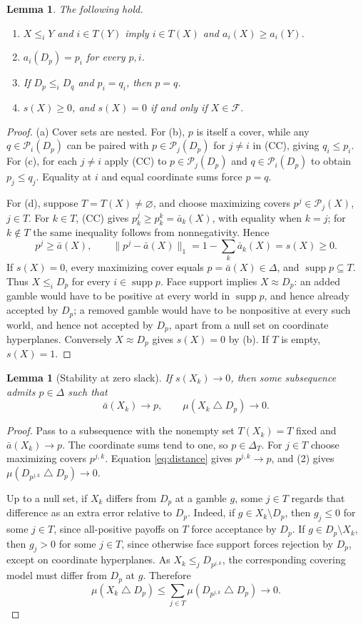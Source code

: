 \documentclass[11pt]{article}
\newtheorem{lemma}[theorem]{Lemma}
\theoremstyle{remark}
\newcommand{\supp}{\operatorname{supp}}
\newcommand{\sd}{\mathbin{\triangle}}
\newcommand{\Pc}{\mathcal P}
\newcommand{\F}{\mathcal F}
\begin{document}
\begin{lemma}\label{lem:elementary}
The following hold.
\begin{enumerate}[label=(\alph*)]
\item $X\le_iY$ and $i\in T(Y)$ imply $i\in T(X)$ and
$a_i(X)\ge a_i(Y)$.
\item $a_i(D_p)=p_i$ for every $p,i$.
\item If $D_p\le_iD_q$ and $p_i=q_i$, then $p=q$.
\item $s(X)\ge0$, and $s(X)=0$ if and only if $X\in\F$.
\end{enumerate}
\end{lemma}
\begin{proof}
(a) Cover sets are nested. For (b), $p$ is itself a cover, while any
$q\in\Pc_i(D_p)$ can be paired with $p\in\Pc_j(D_p)$ for $j\ne i$ in (CC),
giving $q_i\le p_i$. For (c), for each $j\ne i$ apply (CC) to
$p\in\Pc_j(D_p)$ and $q\in\Pc_i(D_p)$ to obtain $p_j\le q_j$.
Equality at $i$ and equal coordinate sums force $p=q$.

For (d), suppose $T=T(X)\ne\varnothing$, and choose maximizing covers
$p^j\in\Pc_j(X)$, $j\in T$. For $k\in T$, (CC) gives
$p^j_k\ge p^k_k=\bar a_k(X)$, with equality when $k=j$; for $k\notin T$ the
same inequality follows from nonnegativity. Hence
\[
 p^j\ge\bar a(X),\qquad
 \|p^j-\bar a(X)\|_1=1-\sum_k\bar a_k(X)=s(X)\ge0.
 \tag{1}\label{eq:distance}
\]
If $s(X)=0$, every maximizing cover equals $p=\bar a(X)\in\Delta$, and
$\supp p\subseteq T$. Thus $X\le_iD_p$ for every $i\in\supp p$.
Face support implies $X\approx D_p$: an added gamble would have to be positive
at every world in $\supp p$, and hence already accepted by $D_p$; a removed
gamble would have to be nonpositive at every such world, and hence not accepted
by $D_p$, apart from a null set on coordinate hyperplanes.
Conversely $X\approx D_p$ gives $s(X)=0$ by (b). If $T$ is empty, $s(X)=1$.
\end{proof}

\begin{lemma}[Stability at zero slack]\label{lem:stability}
If $s(X_k)\to0$, then some subsequence admits $p\in\Delta$ such that
\[
 \bar a(X_k)\longrightarrow p,
 \qquad \mu(X_k\sd D_p)\longrightarrow0.
\]
\end{lemma}
\begin{proof}
Pass to a subsequence with the nonempty set $T(X_k)=T$ fixed and
$\bar a(X_k)\to p$. The coordinate sums tend to one, so $p\in\Delta_T$.
For $j\in T$ choose maximizing covers $p^{j,k}$. Equation
\eqref{eq:distance} gives $p^{j,k}\to p$, and (2) gives
$\mu(D_{p^{j,k}}\sd D_p)\to0$.

Up to a null set, if $X_k$ differs from $D_p$ at a gamble $g$, some
$j\in T$ regards that difference as an extra error relative to $D_p$.
Indeed, if $g\in X_k\setminus D_p$, then $g_j\le0$ for some $j\in T$,
since all-positive payoffs on $T$ force acceptance by $D_p$. If
$g\in D_p\setminus X_k$, then $g_j>0$ for some $j\in T$, since otherwise
face support forces rejection by $D_p$, except on coordinate hyperplanes.
As $X_k\le_jD_{p^{j,k}}$, the corresponding covering model must differ from
$D_p$ at $g$. Therefore
\[
 \mu(X_k\sd D_p)
 \le\sum_{j\in T}\mu(D_{p^{j,k}}\sd D_p)\longrightarrow0.
\]
\end{proof}
\end{document}
